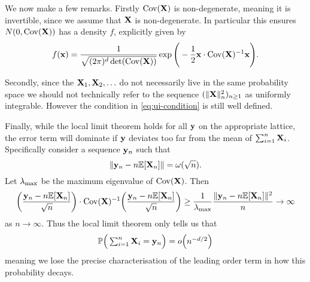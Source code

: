 We now make a few remarks. Firstly $\operatorname{Cov}({\mathbf X})$ is non-degenerate, meaning it is invertible, since we assume that ${\mathbf X}$ is non-degenerate. In particular this ensures $N(0, \operatorname{Cov}({\mathbf X}))$ has a density $f$, explicitly given by
\begin{equation*}
    f({\mathbf x}) = \frac{1}{\sqrt{(2 \pi)^d \det(\operatorname{Cov}({\mathbf X}))}}
    \exp \Bigg(
        -\frac{1}{2} {\mathbf x} \cdot \operatorname{Cov}({\mathbf X})^{-1} {\mathbf x}
        \Bigg).
\end{equation*}

Secondly, since the ${\mathbf X}_1, {\mathbf X}_2, \ldots$ do not necessarily live in the same probability space we should not technically refer to the sequence $(\lVert{\mathbf X}\rVert_n^2)_{n \geq 1}$ as uniformly integrable. However the condition in \cref{eq:ui-condition} is still well defined.

Finally, while the local limit theorem holds for all ${\mathbf y}$ on the appropriate lattice, the error term will dominate if ${\mathbf y}$ deviates too far from the mean of $\sum_{i=1}^n {\mathbf X}_i$. Specifically consider a sequence ${\mathbf y}_n$ such that
\begin{equation*}
    \lVert{\mathbf y}_n - n {\mathbb E}[{\mathbf X}_n]\rVert = \omega(\sqrt{n}).
\end{equation*}
Let ${\lambda_{\text{max}}}$ be the maximum eigenvalue of $\operatorname{Cov}({\mathbf X})$. Then
\begin{equation*}
    \bigg( \frac{{\mathbf y}_n - n {\mathbb E}[{\mathbf X}_n]}{\sqrt{n}} \bigg)
    \cdot \operatorname{Cov}({\mathbf X})^{-1} 
    \bigg( \frac{{\mathbf y}_n - n {\mathbb E}[{\mathbf X}_n]}{\sqrt{n}} \bigg)
    \geq \frac{1}{{\lambda_{\text{max}}}} \frac{\lVert{\mathbf y}_n - n{\mathbb E}[{\mathbf X}_n]\rVert^2}{n} \to \infty
\end{equation*}
as $n \to \infty$. Thus the local limit theorem only tells us that 
\begin{equation*}
    {\mathbb P}\Big( \textstyle \sum_{i=1}^n {\mathbf X}_i = {\mathbf y}_n \Big) = o\Big( n^{-d/2} \Big)
\end{equation*}
meaning we lose the precise characterisation of the leading order term in how this probability decays.


